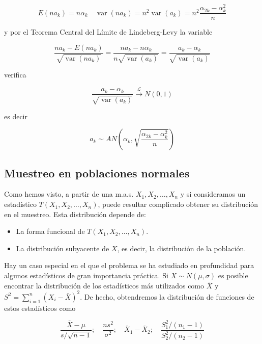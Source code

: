\documentclass[
]{article}
\providecommand{\tightlist}{%
  \setlength{\itemsep}{0pt}\setlength{\parskip}{0pt}}
\begin{document}
\[
E\left(n a_{k}\right)=n \alpha_{k} \quad \operatorname{var}\left(n a_{k}\right)=n^{2} \operatorname{var}\left(a_{k}\right)=n^{2} \frac{\alpha_{2 k}-\alpha_{k}^{2}}{n}
\]

y por el Teorema Central del Límite de Lindeberg-Levy la variable

\[
\frac{n a_{k}-E\left(n a_{k}\right)}{\sqrt{\operatorname{var}\left(n a_{k}\right)}}=\frac{n a_{k}-n \alpha_{k}}{n \sqrt{\operatorname{var}\left(a_{k}\right)}}=\frac{a_{k}-\alpha_{k}}{\sqrt{\operatorname{var}\left(a_{k}\right)}}
\]

verifica

\[
\frac{a_{k}-\alpha_{k}}{\sqrt{\operatorname{var}\left(a_{k}\right)}} \xrightarrow{\mathcal{L}} N(0,1)
\]

es decir

\[
a_{k} \sim A N\left(\alpha_{k}, \sqrt{\frac{\alpha_{2 k}-\alpha_{k}^{2}}{n}}\right)
\]

\subsection{Muestreo en poblaciones normales}\label{muestreo-en-poblaciones-normales}

Como hemos visto, a partir de una m.a.s. \(X_{1}, X_{2}, \ldots, X_{n}\) y si consideramos un estadístico \(T\left(X_{1}, X_{2}, \ldots, X_{n}\right)\), puede resultar complicado obtener su distribución en el muestreo. Esta distribución depende de:

\begin{itemize}
\tightlist
\item
  La forma funcional de \(T\left(X_{1}, X_{2}, \ldots, X_{n}\right)\).
\item
  La distribución subyacente de \(X\), es decir, la distribución de la población.
\end{itemize}

Hay un caso especial en el que el problema se ha estudiado en profundidad para algunos estadísticos de gran importancia práctica. Si \(X \sim N(\mu, \sigma)\) es posible encontrar la distribución de los estadísticos más utilizados como \(\bar{X}\) y \(S^{2}=\sum_{i=1}^{n}\left(X_{i}-\bar{X}\right)^{2}\). De hecho, obtendremos la distribución de funciones de estos estadísticos como

\[
\frac{\bar{X}-\mu}{s / \sqrt{n-1}} ; \quad \frac{n s^{2}}{\sigma^{2}} ; \quad \bar{X}_{1}-\bar{X}_{2} ; \quad \frac{S_{1}^{2} /\left(n_{1}-1\right)}{S_{2}^{2} /\left(n_{2}-1\right)}
\]
\end{document}
